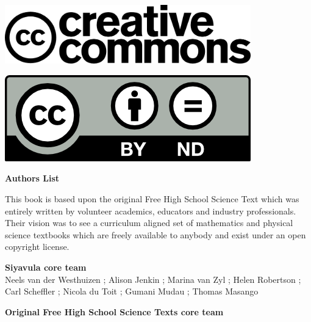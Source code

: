 \vspace*{4in}

\begin{center}
\begin{minipage}{0.6\textwidth}
\includegraphics[width=0.8\textwidth]{../title_images/cc2.png}
\end{minipage}
\begin{minipage}{0.3\textwidth}
\includegraphics[width=0.8\textwidth]{../title_images/cc1.png}
\end{minipage}
\end{center}







\newpage
\thispagestyle{empty}


\begin{flushleft} \textbf{\huge Authors List} \end{flushleft}

{\LARGE This book is based upon the original Free High School Science Text which was entirely written by
volunteer academics, educators and industry professionals. Their vision was to see a curriculum aligned
set of mathematics and physical science textbooks which are freely available to anybody and exist
under an open copyright license.} \par

\textbf{\LARGE Siyavula core team} \\

Neels van der Westhuizen ; Alison Jenkin ; Marina van Zyl ; Helen Robertson ; Carl Scheffler ; Nicola du Toit ; Gumani Mudau ; Thomas Masango \par

\textbf{\LARGE Original Free High School Science Texts core team}\\

